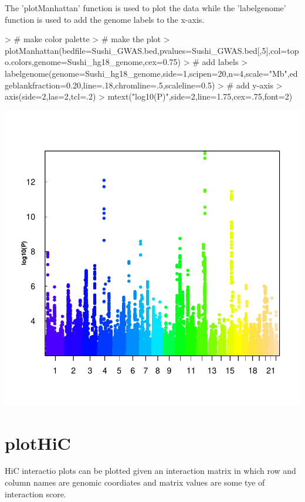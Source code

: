 \documentclass{article}
\begin{document}
The 'plotManhattan' function is used to plot the data while the 'labelgenome' function is used to add the genome labels to the x-axis.

\begin{center}

\begin{Schunk}
\begin{Sinput}
> # make color palette
> # make the plot
> plotManhattan(bedfile=Sushi_GWAS.bed,pvalues=Sushi_GWAS.bed[,5],col=topo.colors,genome=Sushi_hg18_genome,cex=0.75)
> # add labels
> labelgenome(genome=Sushi_hg18_genome,side=1,scipen=20,n=4,scale="Mb",edgeblankfraction=0.20,line=.18,chromline=.5,scaleline=0.5)
> # add y-axis
> axis(side=2,las=2,tcl=.2)
> mtext("log10(P)",side=2,line=1.75,cex=.75,font=2)
\end{Sinput}
\end{Schunk}
\includegraphics{Sushi-003}
\end{center}






\section{plotHiC}

HiC interactio plots can be plotted given an interaction matrix in which row and column names are genomic coordiates and matrix values are some tye of interaction score.
\end{document}
